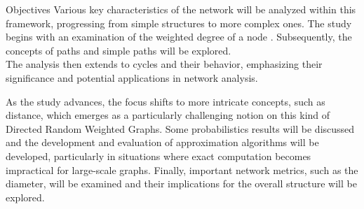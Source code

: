 \begin{projsection}{Objectives}
	Various key characteristics of the network will be analyzed within this framework, progressing from simple structures to more complex ones.
	The study begins with an examination of the weighted degree of a node \cite{gonzalez2010an}. Subsequently, the concepts of paths and simple paths will be explored.\\
	The analysis then extends to cycles and their behavior, emphasizing their significance and potential applications in network analysis.
	
	As the study advances, the focus shifts to more intricate concepts, such as distance, which emerges as a particularly challenging notion on this kind of Directed Random Weighted Graphs.
	Some probabilistics results will be discussed and the development and evaluation of approximation algorithms will be developed, particularly in situations where exact computation becomes impractical for large-scale graphs.
	Finally, important network metrics, such as the diameter, will be examined and their implications for the overall structure will be explored.
\end{projsection}